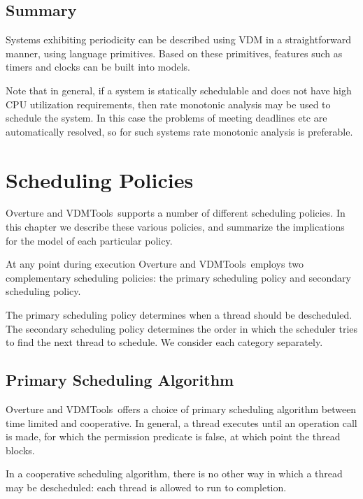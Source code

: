 \documentclass{overturerepchap}
\newcommand{\vdmtools}{VDMTools}
\begin{document}
\section{Summary}

Systems exhibiting periodicity can be described using VDM in a
straightforward manner, using language primitives. Based on these
primitives, features such as timers and clocks can be built into
models.

Note that in general, if a system is statically schedulable and does
not have high CPU utilization requirements, then rate monotonic
analysis \cite{Audsley&93,Burns95} may be used to schedule the system. In
this case the problems of meeting deadlines etc are automatically
resolved, so for such systems rate monotonic analysis is preferable.


\chapter{Scheduling Policies} \label{chap:schedule}

Overture and \vdmtools\ supports a number of different scheduling
policies. In this chapter we describe these various policies, and
summarize the implications for the model of each particular policy.

At any point during execution Overture and \vdmtools\ employs two
complementary scheduling policies: the primary scheduling policy and
secondary scheduling policy.

The primary scheduling policy determines when a thread should be
descheduled. The secondary scheduling policy determines the order in
which the scheduler tries to find the next thread to schedule. We
consider each category separately.

\section{Primary Scheduling Algorithm}

Overture and \vdmtools\ offers a choice of primary scheduling algorithm
between time limited and cooperative. In general, a thread executes
until an operation call is made, for which the permission predicate is
false, at which point the thread blocks.

In a cooperative scheduling algorithm, there is no other way in which
a thread may be descheduled: each thread is allowed to run to
completion.
\end{document}
